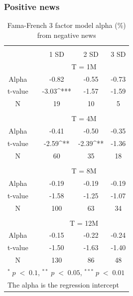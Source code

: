 \subsubsection{Positive news}


\setlength{\tabcolsep}{12pt}
\begin{table}[]
\small
\centering
\caption{Fama-French 3 factor model alpha (\%) from negative news } 
\begin{tabular}{ccccc}

\hline \hline
\\ 
      &  &    1 SD  &  2 SD  &  3 SD    \\ \cline{3-5} 
& & \multicolumn{3}{c}{ T = 1M} \\ \hline 
Alpha   &  & -0.82  & -0.55  & -0.73  \\
t-value &  & -3.03^{***} & -1.57  & -1.59  \\
N       &  &  19    & 10  & 5  \\
        &  &                          &      &      \\
& & \multicolumn{3}{c}{ T = 4M}\\ \hline
Alpha   &  & -0.41  & -0.50  &  -0.35 \\
t-value &  & -2.59^{**} & -2.39^{**}  & -1.36  \\
N       &  & 60      & 35  & 18  \\
        &  &           &      &      \\
& & \multicolumn{3}{c}{ T = 8M} \\ \hline
Alpha   &  & -0.19   & -0.19  & -0.19  \\
t-value &  & -1.58  & -1.25 & -1.07  \\
N       &  & 100 & 63   & 34  \\
        &  &                          &      &      \\
& & \multicolumn{3}{c}{ T = 12M} \\ \hline
Alpha   &  & -0.15  & -0.22  & -0.24  \\
t-value &  & -1.50  & -1.63 & -1.40  \\
N       &  & 130    & 86  & 48 \\\hline \hline
 \multicolumn{5}{l}{ \footnotesize $^* \; p\; <\; 0.1$, $ ^{**} \; p\; <\; 0.05$, $ ^{***} \; p\; <\; 0.01$  } \\ \multicolumn{5}{l}{ \footnotesize The alpha is the regression intercept } \\ 
\end{tabular}
\end{table}

